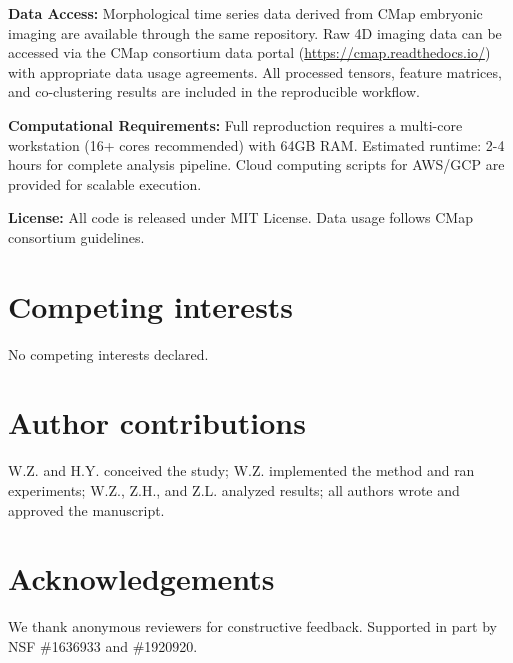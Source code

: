 \documentclass[unnumsec,webpdf,modern,large,namedate]{oup-authoring-template}%
\theoremstyle{thmstyleone}\newtheorem{theorem}{Theorem}
\theoremstyle{thmstyletwo}\newtheorem{example}{Example}
\theoremstyle{thmstylethree}\newtheorem{definition}{Definition}
\begin{document}
\textbf{Data Access:} Morphological time series data derived from CMap embryonic imaging are available through the same repository. Raw 4D imaging data can be accessed via the CMap consortium data portal (\url{https://cmap.readthedocs.io/}) with appropriate data usage agreements. All processed tensors, feature matrices, and co-clustering results are included in the reproducible workflow.

\textbf{Computational Requirements:} Full reproduction requires a multi-core workstation (16+ cores recommended) with 64GB RAM. Estimated runtime: 2-4 hours for complete analysis pipeline. Cloud computing scripts for AWS/GCP are provided for scalable execution.

\textbf{License:} All code is released under MIT License. Data usage follows CMap consortium guidelines.

\section{Competing interests}
No competing interests declared.

\section{Author contributions}
W.Z. and H.Y. conceived the study; W.Z. implemented the method and ran experiments; W.Z., Z.H., and Z.L. analyzed results; all authors wrote and approved the manuscript.

\section{Acknowledgements}
We thank anonymous reviewers for constructive feedback. Supported in part by NSF \#1636933 and \#1920920.



\end{document}
